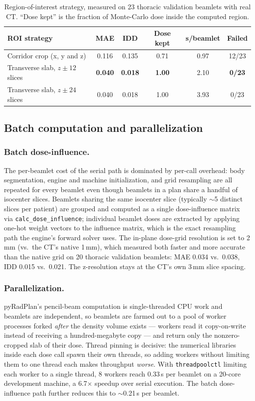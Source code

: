 \documentclass[runningheads]{llncs}
\begin{document}
\begin{table}[t]
\centering
\caption{Region-of-interest strategy, measured on 23 thoracic validation beamlets with real CT. ``Dose kept'' is the fraction of Monte-Carlo dose inside the computed region.}
\label{tab:slab}
\begin{tabular}{lccccc}
\toprule
ROI strategy & MAE & IDD & Dose kept & s/beamlet & Failed\\
\midrule
Corridor crop (x, y and z) & 0.116 & 0.135 & 0.71 & 0.97 & 12/23\\
Transverse slab, $z\pm12$ slices & \textbf{0.040} & \textbf{0.018} & \textbf{1.00} & 2.10 & \textbf{0/23}\\
Transverse slab, $z\pm24$ slices & 0.040 & 0.018 & 1.00 & 3.93 & 0/23\\
\bottomrule
\end{tabular}
\end{table}

\subsection{Batch computation and parallelization}

\subsubsection{Batch dose-influence.}
The per-beamlet cost of the serial path is dominated by per-call overhead: body segmentation, engine and machine initialization, and grid resampling are all repeated for every beamlet even though beamlets in a plan share a handful of isocenter slices. Beamlets sharing the same isocenter slice (typically $\sim$5 distinct slices per patient) are grouped and computed as a single dose-influence matrix via \texttt{calc\_dose\_influence}; individual beamlet doses are extracted by applying one-hot weight vectors to the influence matrix, which is the exact resampling path the engine's forward solver uses. The in-plane dose-grid resolution is set to 2\,mm (vs.\ the CT's native 1\,mm), which measured both faster and more accurate than the native grid on 20 thoracic validation beamlets: MAE 0.034 vs.\ 0.038, IDD 0.015 vs.\ 0.021. The z-resolution stays at the CT's own 3\,mm slice spacing.

\subsubsection{Parallelization.}
pyRadPlan's pencil-beam computation is single-threaded CPU work and beamlets are independent, so beamlets are farmed out to a pool of worker processes forked \emph{after} the density volume exists --- workers read it copy-on-write instead of receiving a hundred-megabyte copy --- and return only the nonzero-cropped slab of their dose. Thread pinning is decisive: the numerical libraries inside each dose call spawn their own threads, so adding workers without limiting them to one thread each makes throughput \emph{worse}. With \texttt{threadpoolctl} limiting each worker to a single thread, 8 workers reach 0.33\,s per beamlet on a 20-core development machine, a 6.7$\times$ speedup over serial execution. The batch dose-influence path further reduces this to $\sim$0.21\,s per beamlet.
\end{document}
